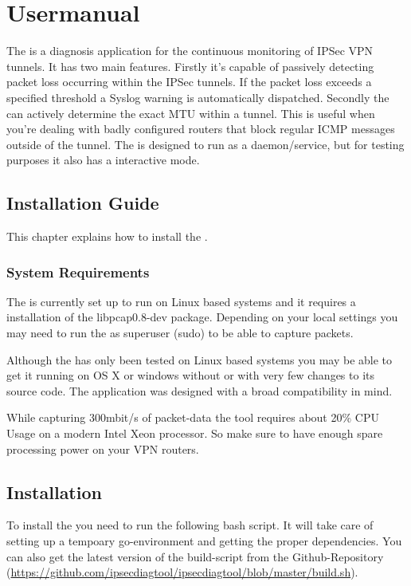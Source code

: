 \chapter{Usermanual}
\label{chap:Usermanual}
The \entool{} is a diagnosis application for the continuous monitoring of \acs{IPSec} \acs{VPN} tunnels. It has two main features. Firstly it's capable of passively detecting packet loss occurring within the \acs{IPSec} tunnels. If the packet loss exceeds a specified threshold a Syslog warning is automatically dispatched. Secondly the \entool{} can actively determine the exact \acs{MTU} within a tunnel. This is useful when you're dealing with badly configured routers that block regular \acs{ICMP} messages outside of the tunnel. The \entool{} is designed to run as a daemon/service, but for testing purposes it also has a interactive mode.

\section{Installation Guide}
This chapter explains how to install the \entool{}.

\subsection{System Requirements}
The \entool{} is currently set up to run on Linux based systems and it requires a installation of the libpcap0.8-dev package. Depending on your local settings you may need to run the \entool{} as superuser (sudo) to be able to capture packets.

Although the \entool{} has only been tested on Linux based systems you may be able to get it running on OS X or windows without or with very few changes to its source code. The application was designed with a broad compatibility in mind.

While capturing 300mbit/s of packet-data the tool requires about 20\% CPU Usage on a modern Intel Xeon processor. So make sure to have enough spare processing power on your VPN routers.


\section{Installation}
To install the \entool{} you need to run the following bash script. It will take care of setting up a tempoary go-environment and getting the proper dependencies. You can also get the latest version of the build-script from the Github-Repository (\url{https://github.com/ipsecdiagtool/ipsecdiagtool/blob/master/build.sh}).

